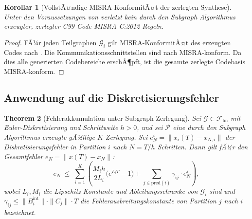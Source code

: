 ﻿\documentclass[12pt,a4paper]{article}
\newtheorem{theorem}{Theorem}[section]
\newtheorem{korollar}[theorem]{Korollar}
\theoremstyle{definition}
\begin{document}
\begin{korollar}[VollstÃ¤ndige MISRA-KonformitÃ¤t der zerlegten Synthese]
\label{kor:misra-subgraph}
Unter den Voraussetzungen von  verletzt kein
durch den Subgraph Algorithmus erzeugter, zerlegter C99-Code
MISRA-C:2012-Regeln.
\end{korollar}

\begin{proof}
FÃ¼r jeden Teilgraphen $\mathcal{G}_i$ gilt MISRA-KonformitÃ¤t des erzeugten
Codes nach . Die Kommunikationsschnittstellen
sind nach  MISRA-konform. Da dies alle generierten
Codebereiche erschÃ¶pft, ist die gesamte zerlegte Codebasis MISRA-konform.
\end{proof}

\subsection{Anwendung auf die Diskretisierungsfehler}
\label{subsec:subgraph-error}

\begin{theorem}[Fehlerakkumulation unter Subgraph-Zerlegung]
\label{thm:subgraph-error}
Sei $\mathcal{G} \in \mathcal{F}_{\mathrm{lin}}$ mit Euler-Diskretisierung
und Schrittweite $h > 0$, und sei $\mathcal{P}$ eine durch den Subgraph
Algorithmus erzeugte gÃ¼ltige $K$-Zerlegung. Sei
$e_N^i = \|x_i(T) - x_{N,i}\|$ der Diskretisierungsfehler in Partition $i$
nach $N = T/h$ Schritten. Dann gilt fÃ¼r den Gesamtfehler
$e_N = \|x(T) - x_N\|$:
\[
  e_N
  \;\leq\;
  \sum_{i=1}^K
  \left(
    \frac{M_i h}{2 L_i} \bigl(e^{L_i T} - 1\bigr)
    + \sum_{j \in \mathrm{pred}(i)} \gamma_{ij} \cdot e_N^j
  \right),
\]
wobei $L_i, M_i$ die Lipschitz-Konstante und Ableitungsschranke von
$\mathcal{G}_i$ sind und $\gamma_{ij} \leq \|B_i^{\mathrm{int}}\| \cdot
\|C_j\| \cdot T$ die Fehlerausbreitungskonstante von Partition $j$ nach
$i$ bezeichnet.
\end{theorem}
\end{document}
